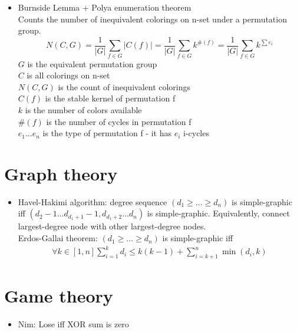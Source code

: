 \documentclass{article}
\begin{document}
\begin{itemize}
\item Burnside Lemma + Polya enumeration theorem \\
Counts the number of inequivalent colorings on n-set under a permutation group. 
\begin{equation*}
	N(C, G) = \frac{1}{|G|} \sum_{f \in G}{|C(f)|} = \frac{1}{|G|} \sum_{f \in G}{k^{\#(f)}} = \frac{1}{|G|} \sum_{f \in G}{k^{\sum{e_i}}}
\end{equation*}
$G$ is the equivalent permutation group \\
$C$ is all colorings on n-set \\
$N(C,G)$ is the count of inequivalent colorings \\
$C(f)$ is the stable kernel of permutation f \\
$k$ is the number of colors available \\
$\#(f)$ is the number of cycles in permutation f \\
$e_1 \hdots e_n$ is the type of permutation f - it has $e_i$ i-cycles \\

\end{itemize}

\section{Graph theory}
\begin{itemize}

\item Havel-Hakimi algorithm: degree sequence $(d_1 \ge \hdots \ge d_n)$ is simple-graphic iff $(d_2-1 \hdots d_{d_1+1}-1, d_{d_1+2} \hdots d_n)$ is simple-graphic. Equivalently, connect largest-degree node with other largest-degree nodes. \\
Erdos-Gallai theorem: $(d_1 \ge \hdots \ge d_n)$ is simple-graphic iff
\begin{align*}
	\forall k \in [1,n] \sum_{i=1}^{k}{d_i} \le k(k-1) + \sum_{i=k+1}^{n}{\min{(d_i, k)}}
\end{align*}

\end{itemize}

\section{Game theory}
\begin{itemize}

\item Nim: Lose iff XOR sum is zero

\end{itemize}
\end{document}

